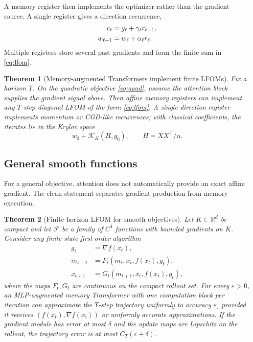\documentclass[10pt,twocolumn]{article}
\newtheorem{theorem}{Theorem}
\newcommand{\R}{\mathbb R}
\newcommand{\Krylov}{\mathcal K}
\begin{document}
A memory register then implements the optimizer rather than the gradient source. A single register gives a direction recurrence,
\begin{align}
   r_\ell &= g_\ell+\gamma_\ell r_{\ell-1},\notag\\
   w_{\ell+1}&=w_\ell+\alpha_\ell r_\ell. \label{eq:direction}
\end{align}
Multiple registers store several past gradients and form the finite sum in \eqref{eq:lfom}.

\begin{theorem}[Memory-augmented Transformers implement finite LFOMs]
Fix a horizon $T$. On the quadratic objective \eqref{eq:quad}, assume the attention block supplies the gradient signal above. Then affine memory registers can implement any $T$-step diagonal LFOM of the form \eqref{eq:lfom}. A single direction register implements momentum or CGD-like recurrences; with classical coefficients, the iterates lie in the Krylov space
\[
   w_0+\Krylov_K(H,g_0),\qquad H=XX^\top/n.
\]
\end{theorem}

\subsection{General smooth functions}
For a general objective, attention does not automatically provide an exact affine gradient. The clean statement separates gradient production from memory execution.

\begin{theorem}[Finite-horizon LFOM for smooth objectives]
Let $K\subset\R^d$ be compact and let $\mathcal F$ be a family of $C^1$ functions with bounded gradients on $K$. Consider any finite-state first-order algorithm
\begin{align*}
   g_t&=\nabla f(x_t),\\
   m_{t+1}&=F_t(m_t,x_t,f(x_t),g_t),\\
   x_{t+1}&=G_t(m_{t+1},x_t,f(x_t),g_t),
\end{align*}
where the maps $F_t,G_t$ are continuous on the compact rollout set. For every $\varepsilon>0$, an MLP-augmented memory Transformer with one computation block per iteration can approximate the $T$-step trajectory uniformly to accuracy $\varepsilon$, provided it receives $(f(x_t),\nabla f(x_t))$ or uniformly accurate approximations. If the gradient module has error at most $\delta$ and the update maps are Lipschitz on the rollout, the trajectory error is at most $C_T(\varepsilon+\delta)$.
\end{theorem}
\end{document}
